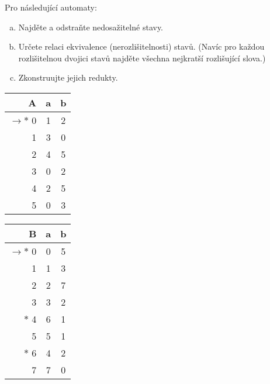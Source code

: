 \documentclass[a4paper,12pt]{amsart}
\begin{document}
\medskip\begin{problem}    
    
    Pro následující automaty:

    \begin{enumerate}[(a)]\setlength\itemsep{6pt}
        \item Najděte a odstraňte nedosažitelné stavy.
        \item Určete relaci ekvivalence (nerozlišitelnosti) stavů. (Navíc pro každou rozlišitelnou dvojici stavů najděte všechna nejkratší rozlišující slova.)
        \item Zkonstruujte jejich redukty.        
    \end{enumerate}
        
    \begin{multicols}{2}

        \centering
    
        \begin{tabular}{ r | c c }
            A & a & b \\ \hline
            $\to\ast$ 0 & 1 & 2 \\  
            1 & 3 & 0 \\
            2 & 4 & 5 \\
            3 & 0 & 2 \\
            4 & 2 & 5 \\
            5 & 0 & 3
        \end{tabular}
            
        \begin{tabular}{ r | c c }
            B  & a & b \\ \hline
            $\to\ast$ 0 & 0 & 5 \\  
            1 & 1 & 3 \\
            2 & 2 & 7 \\
            3 & 3 & 2 \\
            $\ast$ 4 & 6 & 1 \\
            5 & 5 & 1 \\
            $\ast$ 6 & 4 & 2 \\
            7 & 7 & 0
        \end{tabular}

    \end{multicols}

\end{problem}
\end{document}
